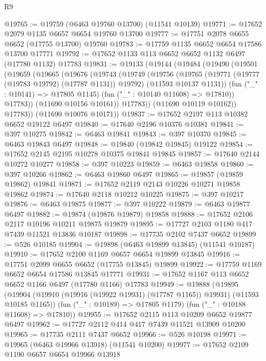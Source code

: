 \begin{lexlean}{R9}
\begin{coremodule}
{{{{{{{{{{{{{{{{{{{{{{{{{{{{{{{{{{{{{{{{{{{{{{{{{{{{{{{{{{{{{{{{{{{{{{{{{{{{{{{{{{{{@19765 := @19759 (@6463 @19760 @13700) (@11541 @10139)
@19771 := @17652 @2079 @1135 @6657 @6654 @19760 @13700
@19777 := @17751 @2078 @6655 @6652 (@17755 @13700) @19760
@19783 := @17759 @1135 @6652 @6654 @17586 @13700 @17771
@19792 := @17652 @1133 @113 @6652 @6652 @1132 @6497 (@17780 @1132) @17783
@19831 := @19133
    (@19144
      (@19484
        (@19490
          (@19501
            (@19659
              (@19665
                (@19676
                  (@19743
                    (@19749
                      (@19756
                        (@19765
                          (@19771 (@19777 (@19783 @19792) (@17787 @1131)) @19792)
                          (@11593 @10137 @1131))
                        (fun ("_" : @10141) => @17805 @1145)
                        (fun ("_" : @10140 @11608) => @17810))
                      @17783))
                  (@11690 @10156 @10161))
                @17783))
            (@11690 @10119 @10162))
          @17783))
      (@11690 @10076 @10171))
@19837 := @17652 @2197 @113 @10382 @6652 @19122 @6497
@19840 := @17640 @2196 @10376 @10381
@19841 := @397 @10275
@19842 := @6463 @19841
@19843 := @397 @10370
@19845 := @6463 @19843 @6497
@19848 := @19840 (@19842 @19845) @19122
@19854 := @17652 @2145 @2195 @10278 @10375 @19841 @19845
@19857 := @17640 @2144 @10272 @10277
@19858 := @397 @10223
@19859 := @6463 @19858
@19860 := @397 @10266
@19862 := @6463 @19860 @6497
@19865 := @19857 (@19859 @19862) @19841
@19871 := @17652 @2119 @2143 @10226 @10271 @19858 @19862
@19874 := @17640 @2118 @10212 @10225
@19875 := @397 @10217
@19876 := @6463 @19875
@19877 := @397 @10222
@19879 := @6463 @19877 @6497
@19882 := @19874 (@19876 @19879) @19858
@19888 := @17652 @2106 @2117 @10196 @10211 @19875 @19879
@19895 := @17727 @2103 @1180 @417 @7439 @11521 @13836 @10187
@19898 := @17735 @2102 @7437 @6652
@19899 := @526 @10185
@19904 := @19898 (@6463 @19899 @13845) (@11541 @10187)
@19910 := @17652 @2100 @1169 @6657 @6654 @19899 @13845
@19916 := @17751 @2099 @6655 @6652 (@17755 @13845) @19899
@19922 := @17759 @1169 @6652 @6654 @17586 @13845 @17771
@19931 := @17652 @1167 @113 @6652 @6652 @1166 @6497 (@17780 @1166) @17783
@19949 := @19888
    (@19895
      (@19904 (@19910 (@19916 (@19922 @19931) (@17787 @1165)) @19931) (@11593 @10185 @1165))
      (fun ("_" : @10189) => @17805 @1179)
      (fun ("_" : @10188 @11608) => @17810))
@19955 := @17652 @2115 @113 @10209 @6652 @19877 @6497
@19962 := @17727 @2112 @414 @417 @7439 @11521 @13909 @10200
@19965 := @17735 @2111 @7437 @6652
@19966 := @526 @10198
@19971 := @19965 (@6463 @19966 @13918) (@11541 @10200)
@19977 := @17652 @2109 @1190 @6657 @6654 @19966 @13918
}}}}}}}}}}}}}}}}}}}}}}}}}}}}}}}}}}}}}}}}}}}}}}}}}}}}}}}}}}}}}}}}}}}}}}}}}}}}}}}}}}}}
\end{coremodule}
\end{lexlean}
